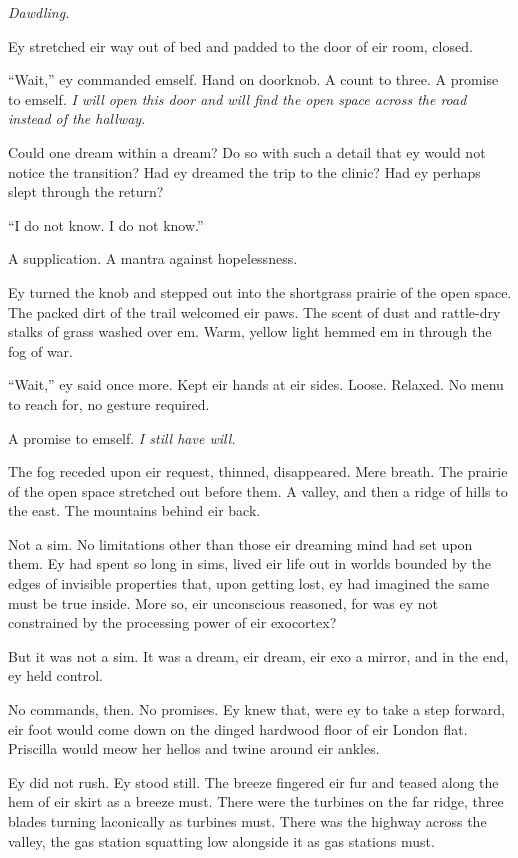 \emph{Dawdling.}

Ey stretched eir way out of bed and padded to the door of eir room, closed.

``Wait,'' ey commanded emself. Hand on doorknob. A count to three. A promise to emself. \emph{I will open this door and will find the open space across the road instead of the hallway.}

Could one dream within a dream? Do so with such a detail that ey would not notice the transition? Had ey dreamed the trip to the clinic? Had ey perhaps slept through the return?

``I do not know. I do not know.''

A supplication. A mantra against hopelessness.

Ey turned the knob and stepped out into the shortgrass prairie of the open space. The packed dirt of the trail welcomed eir paws. The scent of dust and rattle-dry stalks of grass washed over em. Warm, yellow light hemmed em in through the fog of war.

``Wait,'' ey said once more. Kept eir hands at eir sides. Loose. Relaxed. No menu to reach for, no gesture required.

A promise to emself. \emph{I still have will.}

The fog receded upon eir request, thinned, disappeared. Mere breath. The prairie of the open space stretched out before them. A valley, and then a ridge of hills to the east. The mountains behind eir back.

Not a sim. No limitations other than those eir dreaming mind had set upon them. Ey had spent so long in sims, lived eir life out in worlds bounded by the edges of invisible properties that, upon getting lost, ey had imagined the same must be true inside. More so, eir unconscious reasoned, for was ey not constrained by the processing power of eir exocortex?

But it was not a sim. It was a dream, eir dream, eir exo a mirror, and in the end, ey held control.

No commands, then. No promises. Ey knew that, were ey to take a step forward, eir foot would come down on the dinged hardwood floor of eir London flat. Priscilla would meow her hellos and twine around eir ankles.

Ey did not rush. Ey stood still. The breeze fingered eir fur and teased along the hem of eir skirt as a breeze must. There were the turbines on the far ridge, three blades turning laconically as turbines must. There was the highway across the valley, the gas station squatting low alongside it as gas stations must.

